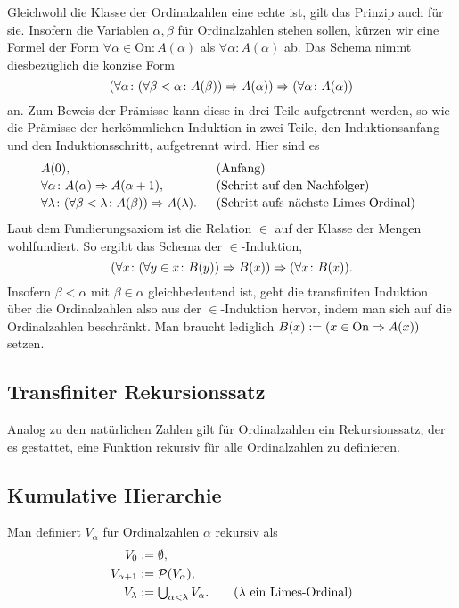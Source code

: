 \noindent
Gleichwohl die Klasse der Ordinalzahlen eine echte ist, gilt das Prinzip
auch für sie. Insofern die Variablen $\alpha,\beta$ für Ordinalzahlen stehen
sollen, kürzen wir eine Formel der Form $\forall\alpha\in\mathrm{On}\colon A(\alpha)$
als $\forall\alpha\colon A(\alpha)$ ab. Das Schema nimmt diesbezüglich
die konzise Form%
\[(\forall\alpha\colon (\forall\beta < \alpha\colon A(\beta))
\Rightarrow A(\alpha))\Rightarrow (\forall\alpha\colon A(\alpha))\]
an. Zum Beweis der Prämisse kann diese in drei Teile aufgetrennt
werden, so wie die Prämisse der herkömmlichen Induktion in zwei
Teile, den Induktionsanfang und den Induktionsschritt, aufgetrennt wird.
Hier sind es
\[\begin{array}{@{}l@{\quad\;\;}l}
A(0), & \text{(Anfang)}\\[2pt]
\forall\alpha\colon A(\alpha)\cond A(\alpha+1), & \text{(Schritt auf den Nachfolger)}\\[2pt]
\forall\lambda\colon (\forall\beta<\lambda\colon A(\beta))\cond A(\lambda). & \text{(Schritt
aufs nächste Limes-Ordinal)}
\end{array}\]
Laut dem Fundierungsaxiom ist die Relation $\in$ auf der Klasse der
Mengen wohlfundiert. So ergibt das Schema der $\in$-Induktion,
\[(\forall x\colon (\forall y\in x\colon B(y))
\Rightarrow B(x))\Rightarrow (\forall x\colon B(x)).\]
Insofern $\beta<\alpha$ mit $\beta\in\alpha$ gleichbedeutend ist,
geht die transfiniten Induktion über die Ordinalzahlen also
aus der $\in$-Induktion hervor, indem man sich auf die Ordinalzahlen
beschränkt. Man braucht lediglich $B(x):=(x\in\mathrm{On}\Rightarrow A(x))$
setzen.

\subsection{Transfiniter Rekursionssatz}

Analog zu den natürlichen Zahlen gilt für Ordinalzahlen ein
Rekursionssatz, der es gestattet, eine Funktion rekursiv für alle
Ordinalzahlen zu definieren.

\subsection{Kumulative Hierarchie}

\begin{Definition}\newlinefirst
Man definiert $V_\alpha$ für Ordinalzahlen $\alpha$ rekursiv als
\begin{align*}
V_0 &:= \emptyset,\\
V_{\alpha+1} &:= \mathcal P(V_\alpha),\\
V_\lambda &:= {\textstyle\bigcup_{\alpha<\lambda} V_\alpha}.\qquad\text{($\lambda$ ein Limes-Ordinal)}
\end{align*}
\end{Definition}

